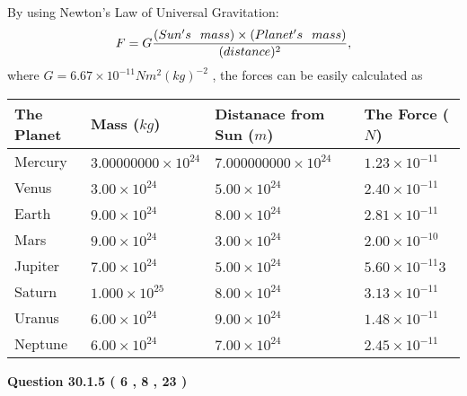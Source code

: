 \documentclass[12pt]{article}
\begin{document}
By using Newton's Law of Universal Gravitation:
\[
F=G \frac{(Sun's \hspace{0.1in} mass) \times (Planet's \hspace{0.1in} mass)} { (distance)^2},
\]
where
$ G= %
6.67 \times 10^{-11} N m^{2}(kg)^{-2}$ , the forces can be easily calculated as
 
\vspace{0.2in}
 
 
\begin{tabular}{|l|l|l|l|}
\hline
The Planet & Mass ($kg$) & Distanace from Sun ($m$) & The Force ($N$)\\
\hline
Mercury  &
           $ %
3.00000000 \times 10^{24}  $   &
             $ %
7.000000000 \times 10^{24}$    & $ %
1.23 \times 10^{-11} $
\\  \hline
Venus    &
           $  %
3.00 \times 10^{24}  $     &
             $ %
5.00 \times 10^{24} $    & $ %
2.40 \times 10^{-11} $
\\  \hline
Earth    &
           $  %
9.00 \times 10^{24}$     &
             $ %
8.00 \times 10^{24} $    & $ %
2.81 \times 10^{-11} $
\\   \hline
Mars     &
           $  %
9.00 \times 10^{24} $     &
             $ %
3.00 \times 10^{24}$    & $ %
2.00 \times 10^{-10} $
\\   \hline
Jupiter  &
           $  %
7.00 \times 10^{24}  $    &
             $ %
5.00 \times 10^{24} $    & $ %
5.60 \times 10^{-11}3 $
\\  \hline
Saturn   &
           $  %
1.000 \times 10^{25}   $    &
             $ %
8.00 \times 10^{24}  $    & $ %
3.13 \times 10^{-11} $
\\  \hline
Uranus   &
           $  %
6.00 \times 10^{24} $    &
             $ %
9.00 \times 10^{24}$    & $ %
1.48 \times 10^{-11} $
\\  \hline
Neptune  &
           $  %
6.00 \times 10^{24}  $    &
             $ %
7.00 \times 10^{24} $    & $ %
2.45 \times 10^{-11} $
\\  \hline
 
\end{tabular}
 
 
 
 
  
\vspace{0.2in}
  
{\textbf{\Large{Question
30.1.5 
 (           6 ,           8 ,          23 )
}}}
  
  
 
\end{document}
